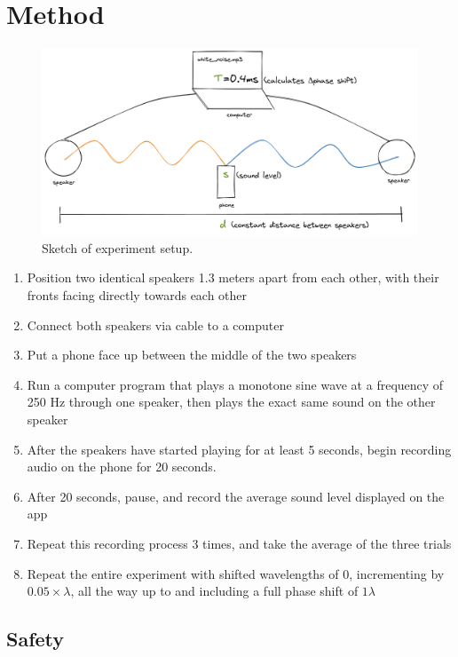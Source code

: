 \documentclass[index]{subfiles}
\begin{document}
\section{Method}

\begin{figure}[H]
    \centering
    \includegraphics[scale=0.24]{sound_diagram.png}
    \caption{Sketch of experiment setup.}
\end{figure}

\begin{enumerate}
    \item Position two identical speakers 1.3 meters apart from each other, with their fronts facing directly towards each other
    \item Connect both speakers via cable to a computer
    \item Put a phone face up between the middle of the two speakers
    \item Run a computer program that plays a monotone sine wave at a frequency of 250 Hz through one speaker, then plays the exact same sound on the other speaker
    \item After the speakers have started playing for at least 5 seconds, begin recording audio on the phone for 20 seconds.
    \item After 20 seconds, pause, and record the average sound level displayed on the app
    \item Repeat this recording process 3 times, and take the average of the three trials
    \item Repeat the entire experiment with shifted wavelengths of 0, incrementing by \(0.05\times\lambda\), all the way up to and including a full phase shift of \(1\lambda\)
\end{enumerate}

\subsection{Safety}
\end{document}
